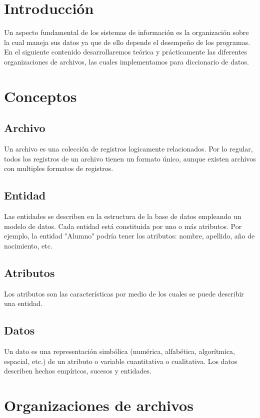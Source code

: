 \chapter[Introducción]{Introducción}

Un aspecto fundamental de los sistemas de información es la organización sobre la cual maneja sus datos ya que de ello depende el desempeño de los programas. En el siguiente contenido desarrollaremos teórica y prácticamente las diferentes organizaciones de archivos, las cuales implementamos para diccionario de datos.


\chapter[Conceptos]{Conceptos}

\section{Archivo}
Un archivo es una colección de registros logicamente relacionados. Por lo	regular, todos los registros de un archivo	tienen un formato único, aunque existen archivos con multiples	 formatos de registros.	

\section{Entidad}
Las entidades se describen en la estructura de la base de datos empleando un modelo de datos.
Cada entidad está constituida por uno o más atributos. Por ejemplo, la entidad "Alumno" podría tener los atributos: nombre, apellido, año de nacimiento, etc.

\section{Atributos}
Los atributos son las características por medio de los cuales se puede describir una entidad.

\section{Datos}
Un dato es una representación simbólica (numérica, alfabética, algorítmica, espacial, etc.) de un atributo o variable cuantitativa o cualitativa. Los datos describen hechos empíricos, sucesos y entidades.

\chapter[Organizaciones de archivos]{Organizaciones de archivos}


